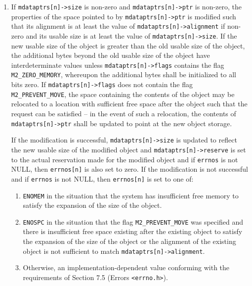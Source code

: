 \documentclass[wd]{isov2}
\begin{document}
{\begin{enumerate}
\begin{enumerate}
\item If \texttt{mdataptrs[n]->size} is non-zero and \texttt{mdataptrs[n]->ptr} is non-zero, the properties of the space pointed to by \texttt{mdataptrs[n]->ptr} is modified such that its alignment is at least the value of \texttt{mdataptrs[n]->alignment} if non-zero and its usable size is at least the value of \texttt{mdataptrs[n]->size}. If the new usable size of the object is greater than the old usable size of the object, the additional bytes beyond the old usable size of the object have interdeterminate values unless \texttt{mdataptrs[n]->flags} contains the flag \texttt{M2\_ZERO\_MEMORY}, whereupon the additional bytes shall be initialized to all bits zero. If \texttt{mdataptrs[n]->flags} does not contain the flag \texttt{M2\_PREVENT\_MOVE}, the space containing the contents of the object may be relocated to a location with sufficient free space after the object such that the request can be satisfied -- in the event of such a relocation, the contents of \texttt{mdataptrs[n]->ptr} shall be updated to point at the new object storage.

If the modification is successful, \texttt{mdataptrs[n]->size} is updated to reflect the new usable size of the modified object and \texttt{mdataptrs[n]->reserve} is set to the actual reservation made for the modified object and if \texttt{errnos} is not NULL, then \texttt{errnos[n]} is also set to zero. If the modification is not successful and if \texttt{errnos} is not NULL, then \texttt{errnos[n]} is set to one of:
\begin{enumerate}
\renewcommand{\theenumii}{\alph{enumii}}
\item \texttt{ENOMEM} in the situation that the system has insufficient free memory to satisfy the expansion of the size of the object.
\item \texttt{ENOSPC} in the situation that the flag \texttt{M2\_PREVENT\_MOVE} was specified and there is insufficient free space existing after the existing object to satisfy the expansion of the size of the object or the alignment of the existing object is not sufficient to match \texttt{mdataptrs[n]->alignment}.
\item Otherwise, an implementation-dependent value conforming with the requirements of Section 7.5 (Errors \texttt{<errno.h>}).
\end{enumerate}


\end{enumerate}
\end{enumerate}}
\end{document}
